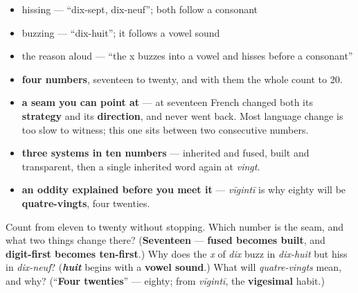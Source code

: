 \begin{itemize}
\raggedright
  \item hissing — \textquotedblleft{}dix-sept, dix-neuf\textquotedblright{}; both follow a consonant
  \item buzzing — \textquotedblleft{}dix-huit\textquotedblright{}; it follows a vowel sound
  \item the reason aloud — \textquotedblleft{}the x buzzes into a vowel and hisses before a consonant\textquotedblright{}
\end{itemize}

\begin{grammarlens}[title={What you've built this chapter}]
\begin{itemize}
\raggedright
  \item \textbf{four numbers}, seventeen to twenty, and with them the whole count to 20.
  \item \textbf{a seam you can point at} — at seventeen French changed both its \textbf{strategy} and its \textbf{direction}, and never went back. Most language change is too slow to witness; this one sits between two consecutive numbers.
  \item \textbf{three systems in ten numbers} — inherited and fused, built and transparent, then a single inherited word again at \emph{vingt}.
  \item \textbf{an oddity explained before you meet it} — \emph{vīgintī} is why eighty will be \textbf{quatre-vingts}, four twenties.
\end{itemize}
\end{grammarlens}

\begin{tcolorbox}[breakable,colback=teal!4,colframe=teal!35!black,title={Before you move on}]
Count from eleven to twenty without stopping. Which number is the seam, and what two things change there? (\textbf{Seventeen} — \textbf{fused becomes built}, and \textbf{digit-first becomes ten-first}.) Why does the \emph{x} of \emph{dix} buzz in \emph{dix-huit} but hiss in \emph{dix-neuf}? (\emph{\textbf{huit}} begins with a \textbf{vowel sound}.) What will \emph{quatre-vingts} mean, and why? (\textquotedblleft{}\textbf{Four twenties}\textquotedblright{} — eighty; from \emph{vīgintī}, the \textbf{vigesimal} habit.)
\end{tcolorbox}

